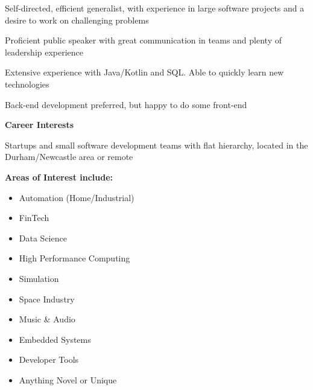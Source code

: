 \documentclass[hidelinks, 12pt, a4paper]{article}
\newcommand{\smitem}[1]{\item {\small {#1}}}
\newenvironment{bullets}{\begin{minipage}[t]{\linewidth}\begin{itemize}[leftmargin=2em,label=-,nosep]}{\end{itemize}\end{minipage}\vspace{2pt}}
\begin{document}
{\begin{minipage}{\dimexpr0.35\textwidth-2\fboxrule-2\fboxsep\relax}
\begin{center}
\begin{minipage}{0.9\linewidth}
					Self-directed, efficient generalist, with experience in large software projects and a desire to work on challenging problems
					
					\vspace{8pt}
					
					Proficient public speaker with great communication in teams and plenty of leadership experience
					
					\vspace{8pt}
					
					Extensive experience with Java/Kotlin and SQL. Able to quickly learn new technologies
					
					\vspace{8pt}
					
					Back-end development preferred, but happy to do some front-end
					
					\vspace{8pt}
					
					\begin{center}
						\begin{Large}
							\textbf{Career Interests}
						\end{Large}
					\end{center}
					
					Startups and small software development teams with flat hierarchy, located in the Durham/Newcastle area or remote
					
					\vspace{8pt}
					
					\textbf{Areas of Interest include:}
					
					\vspace{8pt}
				\end{minipage}
				
				\begin{bullets}
					\smitem{Automation (Home/Industrial)}
					\smitem{FinTech}
					\smitem{Data Science}
					\smitem{High Performance Computing}
					\smitem{Simulation}
					\smitem{Space Industry}
					\smitem{Music \& Audio}
					\smitem{Embedded Systems}
					\smitem{Developer Tools}
					\smitem{Anything Novel or Unique}
				\end{bullets}
				\vspace{56pt}
			\end{center}
		\end{minipage}
	}
	\hspace{0.02\textwidth}
\end{document}
